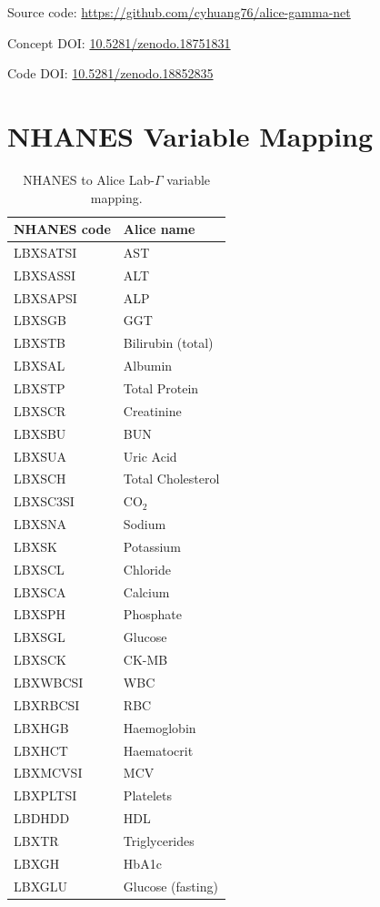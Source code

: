 \documentclass[aps,pre,twocolumn,superscriptaddress,floatfix]{revtex4-2}
\begin{document}
Source code: \url{https://github.com/cyhuang76/alice-gamma-net}

Concept DOI:
\href{https://doi.org/10.5281/zenodo.18751831}{10.5281/zenodo.18751831}

Code DOI:
\href{https://doi.org/10.5281/zenodo.18852835}{10.5281/zenodo.18852835}

\section{NHANES Variable Mapping}
\label{app:mapping}

\begin{table}[h]
\centering
\caption{NHANES to Alice Lab-$\Gamma$ variable mapping.}
\label{tab:nhanes-map}
\begin{tabular}{ll}
\toprule
NHANES code & Alice name \\
\midrule
LBXSATSI & AST \\
LBXSASSI & ALT \\
LBXSAPSI & ALP \\
LBXSGB   & GGT \\
LBXSTB   & Bilirubin (total) \\
LBXSAL   & Albumin \\
LBXSTP   & Total Protein \\
LBXSCR   & Creatinine \\
LBXSBU   & BUN \\
LBXSUA   & Uric Acid \\
LBXSCH   & Total Cholesterol \\
LBXSC3SI & CO$_2$ \\
LBXSNA   & Sodium \\
LBXSK    & Potassium \\
LBXSCL   & Chloride \\
LBXSCA   & Calcium \\
LBXSPH   & Phosphate \\
LBXSGL   & Glucose \\
LBXSCK   & CK-MB \\
LBXWBCSI & WBC \\
LBXRBCSI & RBC \\
LBXHGB   & Haemoglobin \\
LBXHCT   & Haematocrit \\
LBXMCVSI & MCV \\
LBXPLTSI & Platelets \\
LBDHDD   & HDL \\
LBXTR    & Triglycerides \\
LBXGH    & HbA1c \\
LBXGLU   & Glucose (fasting) \\
\bottomrule
\end{tabular}
\end{table}
\end{document}
